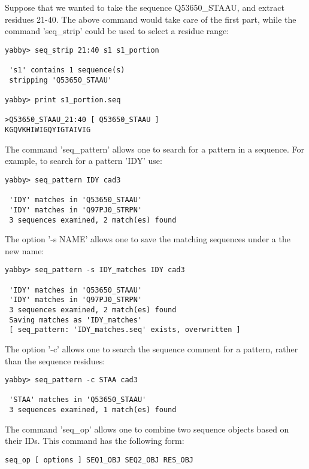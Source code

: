 Suppose that we wanted to take the sequence Q53650\_STAAU, and
extract residues 21-40. The above command would take care of the
first part, while the command 'seq\_strip' could be used to
select a residue range:


\begin{verbatim}
yabby> seq_strip 21:40 s1 s1_portion

 's1' contains 1 sequence(s)
 stripping 'Q53650_STAAU'

yabby> print s1_portion.seq

>Q53650_STAAU_21:40 [ Q53650_STAAU ]
KGQVKHIWIGQYIGTAIVIG
\end{verbatim}

The command 'seq\_pattern' allows one to search for a pattern
in a sequence. For example, to search for a pattern 'IDY' use: 


\begin{verbatim}
yabby> seq_pattern IDY cad3

 'IDY' matches in 'Q53650_STAAU'
 'IDY' matches in 'Q97PJ0_STRPN'
 3 sequences examined, 2 match(es) found
\end{verbatim} 

The option '-s NAME' allows one to save the matching sequences
under a the new name:

\begin{verbatim}
yabby> seq_pattern -s IDY_matches IDY cad3

 'IDY' matches in 'Q53650_STAAU'
 'IDY' matches in 'Q97PJ0_STRPN'
 3 sequences examined, 2 match(es) found
 Saving matches as 'IDY_matches'
 [ seq_pattern: 'IDY_matches.seq' exists, overwritten ]
\end{verbatim}

The option '-c' allows one to search the sequence comment for a
pattern, rather than the sequence residues:

\begin{verbatim}
yabby> seq_pattern -c STAA cad3

 'STAA' matches in 'Q53650_STAAU'
 3 sequences examined, 1 match(es) found
\end{verbatim}

The command 'seq\_op' allows one to combine two sequence objects
based on their IDs. This command has the following form:

\begin{verbatim}
seq_op [ options ] SEQ1_OBJ SEQ2_OBJ RES_OBJ
\end{verbatim}

